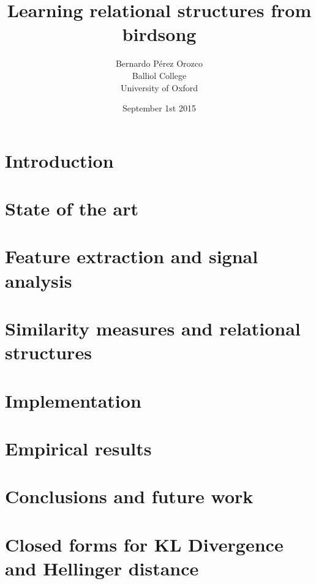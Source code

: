 \documentclass[pdftex,12pt,a4paper]{report}
\title{Learning relational structures from birdsong}
\author{Bernardo Pérez Orozco\\Balliol College\\University of Oxford}
\date{ September 1st 2015 }
\theoremstyle{definition}
\theoremstyle{remark}
\begin{document}
 

\tableofcontents
\newpage
\chapter{Introduction}

 
\chapter{State of the art}



\chapter{Feature extraction and signal analysis}
 

 
\chapter{Similarity measures and relational structures}



\chapter{Implementation}



\chapter{Empirical results}



\chapter{Conclusions and future work}



\appendix

\chapter{Closed forms for KL Divergence and Hellinger distance}





\end{document}
